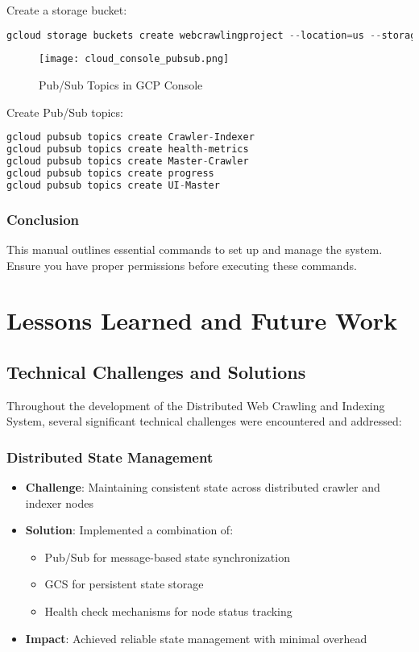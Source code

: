 \documentclass[12pt,a4paper]{report}
\begin{document}
Create a storage bucket:
\begin{lstlisting}[language=Python]
gcloud storage buckets create webcrawlingproject --location=us --storage-class=STANDARD --uniform-bucket-level-access
\end{lstlisting}
\begin{figure}[htb!]
    \centering
    \texttt{[image: cloud\_console\_pubsub.png]}
    \caption{Pub/Sub Topics in GCP Console}
    \label{fig:pubsub-console}
\end{figure}
Create Pub/Sub topics:
\begin{lstlisting}[language=Python]
gcloud pubsub topics create Crawler-Indexer
gcloud pubsub topics create health-metrics
gcloud pubsub topics create Master-Crawler
gcloud pubsub topics create progress
gcloud pubsub topics create UI-Master
\end{lstlisting}

\subsection{Conclusion}
This manual outlines essential commands to set up and manage the system. Ensure you have proper permissions before executing these commands.





\chapter{Lessons Learned and Future Work}

\section{Technical Challenges and Solutions}
Throughout the development of the Distributed Web Crawling and Indexing System, several significant technical challenges were encountered and addressed:

\subsection{Distributed State Management}
\begin{itemize}
\item \textbf{Challenge}: Maintaining consistent state across distributed crawler and indexer nodes
\item \textbf{Solution}: Implemented a combination of:
    \begin{itemize}
        \item Pub/Sub for message-based state synchronization
        \item GCS for persistent state storage
        \item Health check mechanisms for node status tracking
    \end{itemize}
\item \textbf{Impact}: Achieved reliable state management with minimal overhead
\end{itemize}
\end{document}
